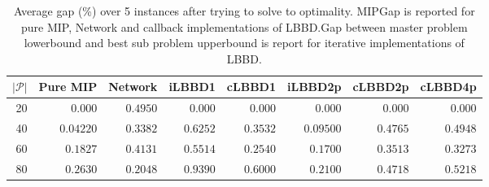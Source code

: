 \begin{table*}
    \centering
    \caption{Average gap (\%) over 5 instances after trying to solve to optimality. MIPGap is reported for pure MIP, Network and callback implementations of LBBD.\@ Gap between master problem lowerbound and best sub problem upperbound is report for iterative implementations of LBBD.}\label{tab:avgGapOpt}
    \begin{tabular}{rrrrrrrr} \toprule
        $|\mathcal{P}|$ & Pure MIP & Network & iLBBD1 & cLBBD1 & iLBBD2p & cLBBD2p & cLBBD4p \\ \midrule
        20              & 0.000 &    $0.4950$     & 0.000 &  0.000 & 0.000 & 0.000 & 0.000 \\
        40              & $0.04220$ & $0.3382 $  & $0.6252 $ & $0.3532 $ & $0.09500 $ & $0.4765 $ & $0.4948$ \\
        60 & $0.1827 $ & $0.4131 $ & $0.5514 $ & $0.2540 $ & $0.1700 $ & $0.3513 $ & $0.3273 $ \\
        80 &  $0.2630 $ &  $0.2048 $ & $0.9390$ &  $0.6000 $ & $0.2100$ & $0.4718 $ & $0.5218$ \\
        \bottomrule
    \end{tabular}
\end{table*}
